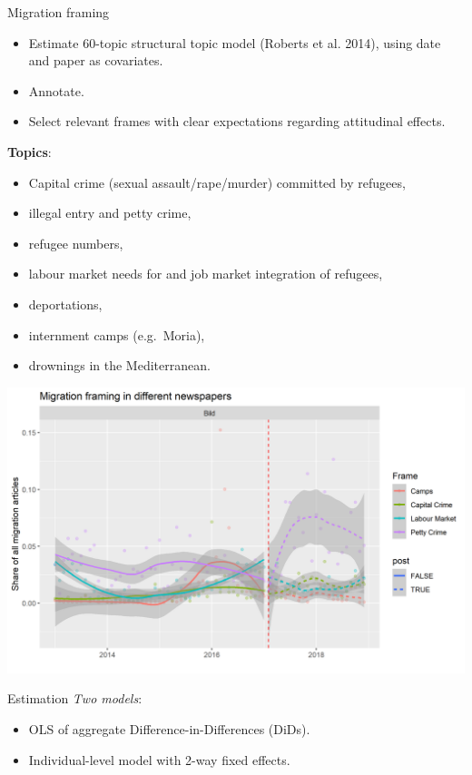 \documentclass[
  ignorenonframetext,
]{beamer}
\providecommand{\tightlist}{%
  \setlength{\itemsep}{0pt}\setlength{\parskip}{0pt}}
\begin{document}
\begin{frame}[allowframebreaks]{Migration framing}
\protect\hypertarget{migration-framing}{}
\begin{itemize}
\tightlist
\item
  Estimate 60-topic structural topic model (Roberts et al. 2014), using
  date and paper as covariates.
\item
  Annotate.
\item
  Select relevant frames with clear expectations regarding attitudinal
  effects.
\end{itemize}

\framebreak

\textbf{Topics}:

\begin{itemize}
\tightlist
\item
  Capital crime (sexual assault/rape/murder) committed by refugees,
\item
  illegal entry and petty crime,
\item
  refugee numbers,
\item
  labour market needs for and job market integration of refugees,
\item
  deportations,
\item
  internment camps (e.g.~Moria),
\item
  drownings in the Mediterranean.
\end{itemize}

\framebreak

\includegraphics{vis/frames_papers_pres.png}
\end{frame}

\begin{frame}{Estimation}
\protect\hypertarget{estimation}{}
\emph{Two models}:

\begin{itemize}
\tightlist
\item
  OLS of aggregate Difference-in-Differences (DiDs).
\item
  Individual-level model with 2-way fixed effects.
\end{itemize}
\end{frame}
\end{document}
